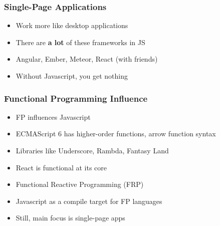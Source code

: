 \begin{frame}
\end{frame}

\begin{frame}
  \frametitle{Single-Page Applications}
  \begin{itemize}
    \pause
    \item<+-> Work more like desktop applications
    \item<+-> There are \textbf{a lot} of these frameworks in JS
    \item<+-> Angular, Ember, Meteor, React (with friends)
    \item<+-> Without Javascript, you get nothing
  \end{itemize}
\end{frame}

\begin{frame}
  \frametitle{Functional Programming Influence}
  \begin{itemize}
    \pause
    \item<+-> FP influences Javascript
    \item<+-> ECMAScript 6 has higher-order functions, arrow function syntax
    \item<+-> Libraries like Underscore, Rambda, Fantasy Land
    \item<+-> React is functional at its core
    \item<+-> Functional Reactive Programming (FRP)
    \item<+-> Javascript as a compile target for FP languages
    \item<+-> Still, main focus is single-page apps
  \end{itemize}
\end{frame}

